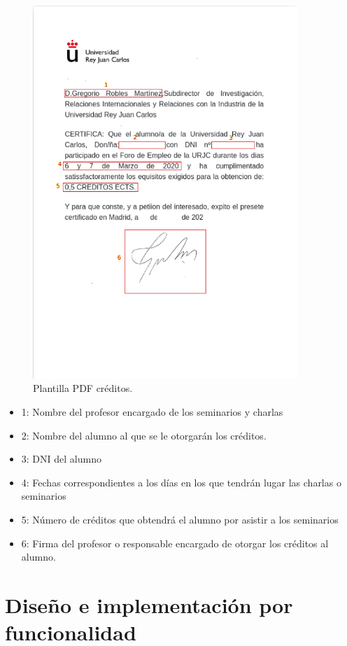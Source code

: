 \documentclass[a4paper, 12pt]{book}
\begin{document}
\begin{figure}
  \centering
  \includegraphics[width=10cm, keepaspectratio]{img/certificadoCreditos.png}
  \caption{Plantilla PDF créditos.}\label{fig:pdfcreditos}
\end{figure}

\begin{itemize}
		\item 1: Nombre del profesor encargado de los seminarios y charlas
		\item 2: Nombre del alumno al que se le otorgarán los créditos.
		\item 3: DNI del alumno
		\item 4: Fechas correspondientes a los días en los que tendrán lugar las charlas o seminarios
		\item 5: Número de créditos que obtendrá el alumno por asistir a los seminarios
		\item 6: Firma del profesor o responsable encargado de otorgar los créditos al alumno.
		\end{itemize}


\section{Diseño e implementación por funcionalidad } 
\end{document}
